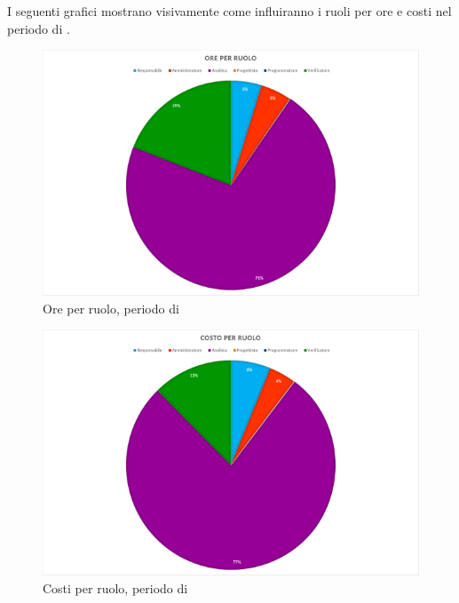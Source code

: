 I seguenti grafici mostrano visivamente come influiranno i ruoli per ore e costi nel periodo di \AD.
\begin{figure}[H]
	\centering
	\includegraphics[width=14cm]{img_peconomico/AD_OR.png}
	\caption{Ore per ruolo, periodo di \AD}
\end{figure}
\begin{figure}[H]
	\centering
	\includegraphics[width=14cm]{img_peconomico/AD_CR.png}
	\caption{Costi per ruolo, periodo di \AD}
\end{figure}

